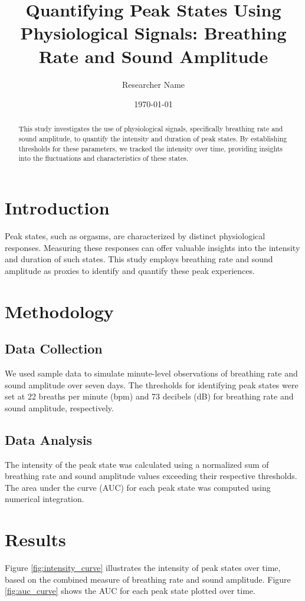 \documentclass{article}
\begin{document}
\title{Quantifying Peak States Using Physiological Signals: Breathing Rate and Sound Amplitude}
\author{Researcher Name}
\date{\today}
\maketitle

\begin{abstract}
This study investigates the use of physiological signals, specifically breathing rate and sound amplitude, to quantify the intensity and duration of peak states. By establishing thresholds for these parameters, we tracked the intensity over time, providing insights into the fluctuations and characteristics of these states.
\end{abstract}

\section{Introduction}
Peak states, such as orgasms, are characterized by distinct physiological responses. Measuring these responses can offer valuable insights into the intensity and duration of such states. This study employs breathing rate and sound amplitude as proxies to identify and quantify these peak experiences.

\section{Methodology}
\subsection{Data Collection}
We used sample data to simulate minute-level observations of breathing rate and sound amplitude over seven days. The thresholds for identifying peak states were set at 22 breaths per minute (bpm) and 73 decibels (dB) for breathing rate and sound amplitude, respectively.

\subsection{Data Analysis}
The intensity of the peak state was calculated using a normalized sum of breathing rate and sound amplitude values exceeding their respective thresholds. The area under the curve (AUC) for each peak state was computed using numerical integration.

\section{Results}
Figure \ref{fig:intensity_curve} illustrates the intensity of peak states over time, based on the combined measure of breathing rate and sound amplitude. Figure \ref{fig:auc_curve} shows the AUC for each peak state plotted over time.
\end{document}
